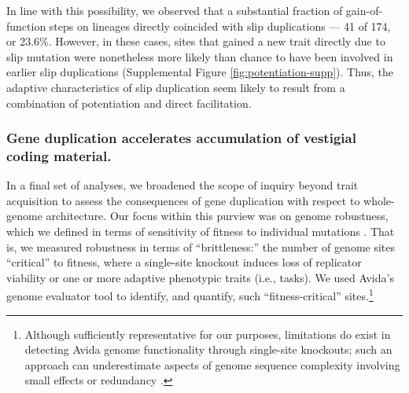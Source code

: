 In line with this possibility, we observed that a substantial fraction of gain-of-function steps on lineages directly coincided with slip duplications --- 41 of 174, or 23.6\%.
However, in these cases, sites that gained a new trait directly due to slip mutation were nonetheless more likely than chance to have been involved in earlier slip duplications (Supplemental Figure \ref{fig:potentiation-supp}).
Thus, the adaptive characteristics of slip duplication seem likely to result from a combination of potentiation and direct facilitation.

\subsubsection{Gene duplication accelerates accumulation of vestigial coding material.}



In a final set of analyses, we broadened the scope of inquiry beyond trait acquisition to assess the consequences of gene duplication with respect to whole-genome architecture.
Our focus within this purview was on genome robustness, which we defined in terms of sensitivity of fitness to individual mutations \citep{lenski1999genome}.
That is, we measured robustness in terms of ``brittleness:'' the number of genome sites ``critical'' to fitness, where a single-site knockout induces loss of replicator viability or one or more adaptive phenotypic traits (i.e., tasks).
We used Avida's genome evaluator tool to identify, and quantify, such ``fitness-critical'' sites.\footnote{%
Although sufficiently representative for our purposes, limitations do exist in detecting Avida genome functionality through single-site knockouts; such an approach can underestimate aspects of genome sequence complexity involving small effects or redundancy \citep{lenski1999genome,moreno2024cryptic}.
}

